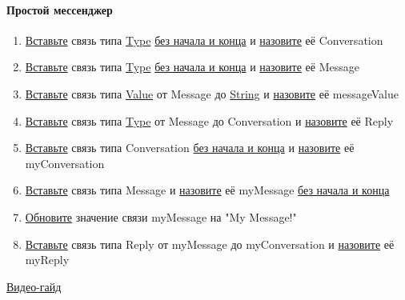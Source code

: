 \paragraph{Простой мессенджер}
\begin{enumerate}
      \item \hyperlink{DeepCase.InsertLink.Description}{Вставьте} связь типа
            \hyperlink{Core.Type.Description}{Type}
            \hyperlink{FAQ.HowToInsertLinkWithoutFromAndTo}{без
                  начала и конца} и \hyperlink{FAQ.HowToSetName}{назовите} её
            Conversation
      \item \hyperlink{DeepCase.InsertLink.Description}{Вставьте} связь типа
            \hyperlink{Core.Type.Description}{Type}
            \hyperlink{FAQ.HowToInsertLinkWithoutFromAndTo}{без
                  начала и конца} и
            \hyperlink{FAQ.HowToSetName}{назовите} её Message
      \item \hyperlink{DeepCase.InsertLink.Description}{Вставьте} связь типа
            \hyperlink{Core.Value.Description}{Value} от Message до
            \hyperlink{Core.String.Description}{String} и
            \hyperlink{FAQ.HowToSetName}{назовите} её messageValue
      \item \hyperlink{DeepCase.InsertLink.Description}{Вставьте} связь типа
            \hyperlink{Core.Type.Description}{Type} от Message до Conversation
            и
            \hyperlink{FAQ.HowToSetName}{назовите} её Reply
      \item \hyperlink{DeepCase.InsertLink.Description}{Вставьте} связь типа
            Conversation
            \hyperlink{FAQ.HowToInsertLinkWithoutFromAndTo}{без начала и конца} и
            \hyperlink{FAQ.HowToSetName}{назовите} её myConversation
      \item \hyperlink{DeepCase.InsertLink.Description}{Вставьте} связь типа
            Message и \hyperlink{FAQ.HowToSetName}{назовите} её myMessage
            \hyperlink{FAQ.HowToInsertLinkWithoutFromAndTo}{без начала и конца}
      \item \hyperlink{DeepCase.UpdateLink.Description}{Обновите} значение связи
            myMessage на "My Message!"
      \item \hyperlink{DeepCase.InsertLink.Description}{Вставьте} связь типа
            Reply от
            myMessage до myConversation и \hyperlink{FAQ.HowToSetName}{назовите} её
            myReply
\end{enumerate}
\href{https://youtu.be/1ihR5gZrw6M}{Видео-гайд}
